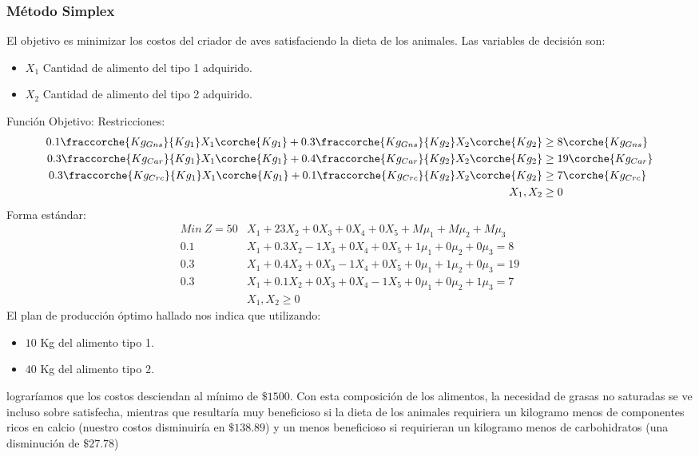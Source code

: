 \begin{homeworkProblem}

\subsubsection{Método Simplex}
El objetivo es minimizar los costos del criador de aves satisfaciendo la dieta de los animales.
Las variables de decisión son:
\begin{itemize}
  \item $X_1$ Cantidad de alimento del tipo 1 adquirido.
  \item $X_2$ Cantidad de alimento del tipo 2 adquirido.
\end{itemize}
Función Objetivo: 
Restricciones:
\begin{align*}
  0.1\fraccorche{Kg_{Gns}}{Kg_1}X_1\corche{Kg_1} + 0.3\fraccorche{Kg_{Gns}}{Kg_2}X_2\corche{Kg_2} &\ge 8\corche{Kg_{Gns}} \\
  0.3\fraccorche{Kg_{Car}}{Kg_1}X_1\corche{Kg_1} + 0.4\fraccorche{Kg_{Car}}{Kg_2}X_2\corche{Kg_2} &\ge 19\corche{Kg_{Car}} \\
  0.3\fraccorche{Kg_{Crc}}{Kg_1}X_1\corche{Kg_1} + 0.1\fraccorche{Kg_{Crc}}{Kg_2}X_2\corche{Kg_2} &\ge 7\corche{Kg_{Crc}} \\
  X_1,X_2 &\ge 0 \\
\end{align*}
Forma estándar:
\begin{align*}
    Min\ Z = 50&X_1 + 23X_2 + 0X_3 + 0X_4 + 0X_5 + M\mu_1 + M\mu_2 + M\mu_3 \\
    0.1&X_1 + 0.3X_2 - 1X_3 + 0X_4 + 0X_5 + 1\mu_1 + 0\mu_2 + 0\mu_3 = 8 \\
    0.3&X_1 + 0.4X_2 + 0X_3 - 1X_4 + 0X_5 + 0\mu_1 + 1\mu_2 + 0\mu_3 = 19 \\
    0.3&X_1 + 0.1X_2 + 0X_3 + 0X_4 - 1X_5 + 0\mu_1 + 0\mu_2 + 1\mu_3 = 7 \\
    &X_1,X_2 \ge 0
\end{align*}
El plan de producción óptimo hallado nos indica que utilizando: 
\begin{itemize}
  \item $10$ Kg del alimento tipo 1.
  \item $40$ Kg del alimento tipo 2.
\end{itemize}
lograríamos que los costos desciendan al mínimo de $\$1500$. Con esta composición de los alimentos, la necesidad de grasas no saturadas se ve incluso sobre satisfecha, mientras que resultaría muy beneficioso si la dieta de los animales requiriera un kilogramo menos de componentes ricos en calcio (nuestro costos disminuiría en $\$138.89$) y un menos beneficioso si requirieran un kilogramo menos de carbohidratos (una disminución de $\$27.78$)


\end{homeworkProblem}
